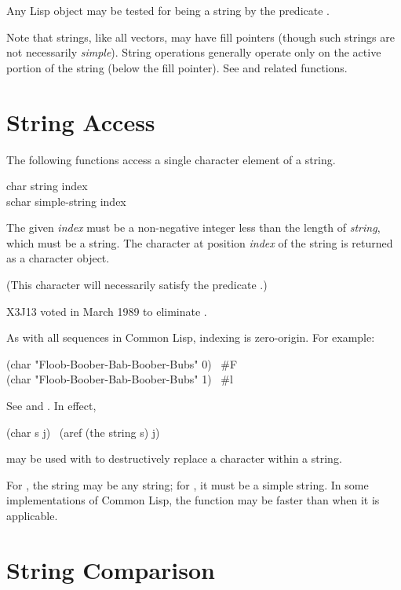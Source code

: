 Any Lisp object may be tested for being a string by
the predicate .

Note that strings, like all vectors, may have fill pointers
(though such strings are not necessarily {\it simple}).
String operations generally operate only on the active portion of the string
(below the fill pointer).  See  and related
functions.

\section{String Access}

The following functions access a single character element of a string.

\begin{defun}[Function]
char string index \\
schar simple-string index

The given {\it index} must be a non-negative integer less than
the length of {\it string}, which must be a
string.  The character at position {\it index}
of the string is returned as a character object.
\begin{obsolete}
(This character will necessarily satisfy the predicate .)
\end{obsolete}
\begin{newer}
X3J13 voted in March 1989 
to eliminate .
\end{newer}
As with all sequences in Common Lisp, indexing is zero-origin.
For example:
\begin{lisp}
(char "Floob-Boober-Bab-Boober-Bubs" 0) \EV\ \#{\Xbackslash}F \\
(char "Floob-Boober-Bab-Boober-Bubs" 1) \EV\ \#{\Xbackslash}l
\end{lisp}
See  and .  In effect,
\begin{lisp}
(char s j) \EQ\ (aref (the string s) j)
\end{lisp}
 may be used with  to destructively replace
a character within a string.

For , the string may be any string;
for , it must be a simple string.
In some implementations of Common Lisp, the function  may
be faster than  when it is applicable.
\end{defun}

\section{String Comparison}

